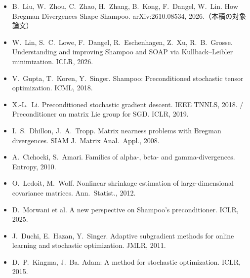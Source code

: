 \documentclass[a4paper,11pt]{ltjsarticle}
\theoremstyle{definition}
\theoremstyle{plain}
\begin{document}
\begin{itemize}\small
  \item B.~Liu, W.~Zhou, C.~Zhao, H.~Zhang, B.~Kong, F.~Dangel, W.~Lin. How Bregman Divergences Shape Shampoo. arXiv:2610.08534, 2026.（本稿の対象論文）
  \item W.~Lin, S.~C.~Lowe, F.~Dangel, R.~Eschenhagen, Z.~Xu, R.~B.~Grosse. Understanding and improving Shampoo and SOAP via Kullback--Leibler minimization. ICLR, 2026.
  \item V.~Gupta, T.~Koren, Y.~Singer. Shampoo: Preconditioned stochastic tensor optimization. ICML, 2018.
  \item X.-L.~Li. Preconditioned stochastic gradient descent. IEEE TNNLS, 2018. / Preconditioner on matrix Lie group for SGD. ICLR, 2019.
  \item I.~S.~Dhillon, J.~A.~Tropp. Matrix nearness problems with Bregman divergences. SIAM J.\ Matrix Anal.\ Appl., 2008.
  \item A.~Cichocki, S.~Amari. Families of alpha-, beta- and gamma-divergences. Entropy, 2010.
  \item O.~Ledoit, M.~Wolf. Nonlinear shrinkage estimation of large-dimensional covariance matrices. Ann.\ Statist., 2012.
  \item D.~Morwani et al. A new perspective on Shampoo's preconditioner. ICLR, 2025.
  \item J.~Duchi, E.~Hazan, Y.~Singer. Adaptive subgradient methods for online learning and stochastic optimization. JMLR, 2011.
  \item D.~P.~Kingma, J.~Ba. Adam: A method for stochastic optimization. ICLR, 2015.
\end{itemize}
\end{document}
